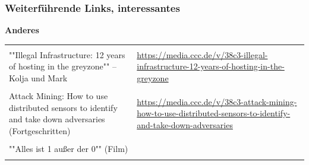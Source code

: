 \begin{frame}
    \frametitle{Weiterführende Links, interessantes}

    \textbf{\large Anderes}

    \begin{table}[H]
        \begin{tabularx}{\linewidth}{|lX|}
            &\\
            \parbox{.4\linewidth}{""Illegal Infrastructure: 12 years of hosting in the greyzone"" -- Kolja und Mark}&\url{https://media.ccc.de/v/38c3-illegal-infrastructure-12-years-of-hosting-in-the-greyzone}\\
            &\\
            \parbox{.4\linewidth}{Attack Mining: How to use distributed sensors to identify and take down adversaries (Fortgeschritten)}&\url{https://media.ccc.de/v/38c3-attack-mining-how-to-use-distributed-sensors-to-identify-and-take-down-adversaries}\\
            &\\
            ""Alles ist 1 außer der 0"" (Film)&\\
            \\
        \end{tabularx}
    \end{table}

\end{frame}
